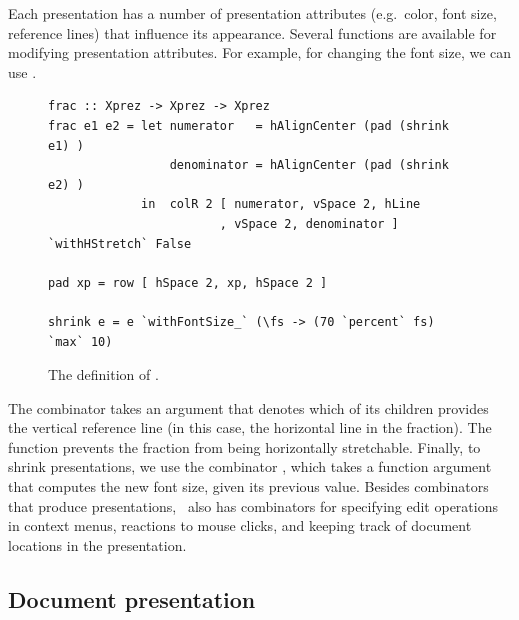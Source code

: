 \documentclass[12pt]{article}
\begin{document}
\begin{center}
\end{center}
\bc
Each presentation has a number of presentation attributes (e.g.\ color, font size, reference lines) that influence its appearance. Several functions are available for modifying presentation attributes. For example, for changing the font size, we can use . 
\ec


\begin{figure}
\begin{center}
\begin{footnotesize}
\begin{verbatim}
frac :: Xprez -> Xprez -> Xprez
frac e1 e2 = let numerator   = hAlignCenter (pad (shrink e1) )
                 denominator = hAlignCenter (pad (shrink e2) )
             in  colR 2 [ numerator, vSpace 2, hLine
                        , vSpace 2, denominator ] `withHStretch` False
                        
pad xp = row [ hSpace 2, xp, hSpace 2 ]

shrink e = e `withFontSize_` (\fs -> (70 `percent` fs) `max` 10)
\end{verbatim}
\end{footnotesize}
\caption{The definition of .} \label{fig:xprezFrac} 
\end{center}
\end{figure}


The  combinator takes an argument that denotes which of its children provides the vertical reference line (in this case, the horizontal line in the fraction). The  function prevents the fraction from being horizontally stretchable. Finally, to shrink presentations, we use the combinator , which takes a function argument that computes the new font size, given its previous value. Besides combinators that produce presentations, \Xprez\ also has combinators for specifying edit operations in context menus, reactions to mouse clicks, and keeping track of document locations in the presentation.


\subsection{Document presentation}
\end{document}
